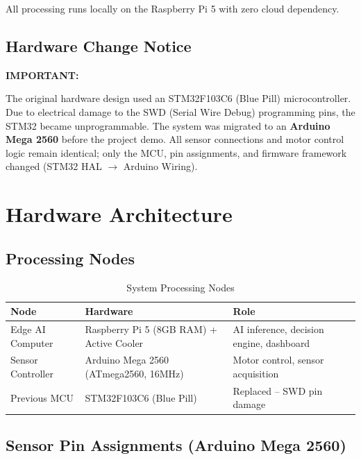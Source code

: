 \documentclass[11pt,a4paper]{article}
\newenvironment{important}[1][IMPORTANT]{%
    \medskip\noindent\color{firerose}\textbf{#1:}\color{black}\ \begin{itshape}%
}{\end{itshape}\medskip}
\begin{document}
All processing runs locally on the Raspberry Pi 5 with zero cloud dependency.

\subsection{Hardware Change Notice}
\begin{important}
The original hardware design used an STM32F103C6 (Blue Pill) microcontroller. Due to electrical damage to the SWD (Serial Wire Debug) programming pins, the STM32 became unprogrammable. The system was migrated to an \textbf{Arduino Mega 2560} before the project demo. All sensor connections and motor control logic remain identical; only the MCU, pin assignments, and firmware framework changed (STM32 HAL $\rightarrow$ Arduino Wiring).
\end{important}

\section{Hardware Architecture}

\subsection{Processing Nodes}
\begin{table}[h]
\centering
\caption{System Processing Nodes}
\begin{tabularx}{\textwidth}{l l X}
\toprule
\textbf{Node} & \textbf{Hardware} & \textbf{Role} \\
\midrule
Edge AI Computer & Raspberry Pi 5 (8GB RAM) + Active Cooler & AI inference, decision engine, dashboard \\
Sensor Controller & Arduino Mega 2560 (ATmega2560, 16MHz) & Motor control, sensor acquisition \\
Previous MCU & STM32F103C6 (Blue Pill) & Replaced -- SWD pin damage \\
\bottomrule
\end{tabularx}
\end{table}

\subsection{Sensor Pin Assignments (Arduino Mega 2560)}
\end{document}
